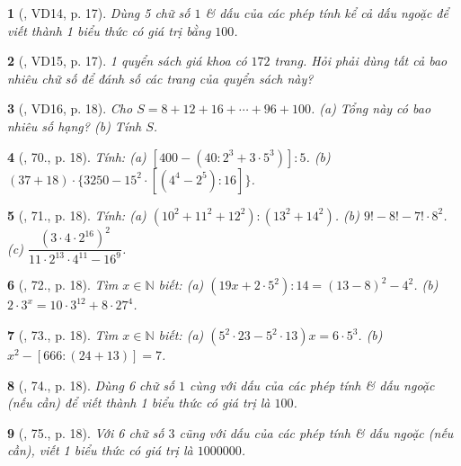 \documentclass{article}
\newtheorem{baitoan}{}
\begin{document}
\begin{baitoan}[\cite{Tuyen_Toan_6}, VD14, p. 17]
	Dùng 5 chữ số $1$ \& dấu của các phép tính kể cả dấu ngoặc để viết thành 1 biểu thức có giá trị bằng $100$.
\end{baitoan}

\begin{baitoan}[\cite{Tuyen_Toan_6}, VD15, p. 17]
	1 quyển sách giá khoa có $172$ trang. Hỏi phải dùng tất cả bao nhiêu chữ số để đánh số các trang của quyển sách này?
\end{baitoan}

\begin{baitoan}[\cite{Tuyen_Toan_6}, VD16, p. 18]
	Cho $S = 8 + 12 + 16 + \cdots + 96 +100$. (a) Tổng này có bao nhiêu số hạng? (b) Tính $S$.
\end{baitoan}

\begin{baitoan}[\cite{Tuyen_Toan_6}, 70., p. 18]
	Tính: (a) $[400 - (40:2^3 + 3\cdot5^3)]:5$. (b) $(37 + 18)\cdot\{3250 - 15^2\cdot[(4^4 - 2^5):16]\}$.
\end{baitoan}

\begin{baitoan}[\cite{Tuyen_Toan_6}, 71., p. 18]
	Tính: (a) $(10^2 + 11^2 + 12^2):(13^2 + 14^2)$. (b) $9! - 8! - 7!\cdot8^2$. (c) $\dfrac{(3\cdot4\cdot2^{16})^2}{11\cdot2^{13}\cdot4^{11} - 16^9}$.
\end{baitoan}

\begin{baitoan}[\cite{Tuyen_Toan_6}, 72., p. 18]
	Tìm $x\in\mathbb{N}$ biết: (a) $(19x + 2\cdot5^2):14 = (13 - 8)^2 - 4^2$. (b) $2\cdot3^x = 10\cdot3^{12} + 8\cdot27^4$. 
\end{baitoan}

\begin{baitoan}[\cite{Tuyen_Toan_6}, 73., p. 18]
	Tìm $x\in\mathbb{N}$ biết: (a) $(5^2\cdot23 - 5^2\cdot13)x = 6\cdot5^3$. (b) $x^2 - [666:(24 + 13)] = 7$.
\end{baitoan}

\begin{baitoan}[\cite{Tuyen_Toan_6}, 74., p. 18]
	Dùng 6 chữ số $1$ cùng với dấu của các phép tính \& dấu ngoặc (nếu cần) để viết thành 1 biểu thức có giá trị là $100$.
\end{baitoan}

\begin{baitoan}[\cite{Tuyen_Toan_6}, 75., p. 18]
	Với 6 chữ số $3$ cũng với dấu của các phép tính \& dấu ngoặc (nếu cần), viết 1 biểu thức có giá trị là $1000000$.
\end{baitoan}
\end{document}
